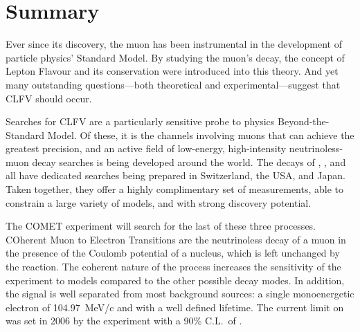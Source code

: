 \chapter{Summary}

Ever since its discovery, the muon has been instrumental in the development of particle physics' Standard Model.
By studying the muon's decay, the concept of Lepton Flavour and its conservation were introduced into this theory.
And yet many outstanding questions---both theoretical and experimental---suggest that \ac{CLFV} should occur.

Searches for \ac{CLFV} are a particularly sensitive probe to physics Beyond-the-Standard Model.
Of these, it is the channels involving muons that can achieve the greatest precision, and an active field of low-energy, high-intensity neutrinoless-muon decay searches is being developed around the world.
The decays of \muegamma, \muThreeE, and \muec all have dedicated searches being prepared in Switzerland, the USA, and Japan.
Taken together, they offer a highly complimentary set of measurements, able to constrain a large variety of models, and with strong discovery potential.

The COMET experiment will search for the last of these three processes.
COherent Muon to Electron Transitions are the neutrinoless decay of a muon in the presence of the Coulomb potential of a nucleus, which is left unchanged by the reaction.
The coherent nature of the process increases the sensitivity of the experiment to models compared to the other possible decay modes.
In addition, the signal is well separated from most background sources: a single monoenergetic electron of 104.97~MeV/c and with a well defined lifetime.
The current limit on \mueconv was set in 2006 by the \sindrumII experiment with a 90\% C.L.\ of  \senseSindrum.

